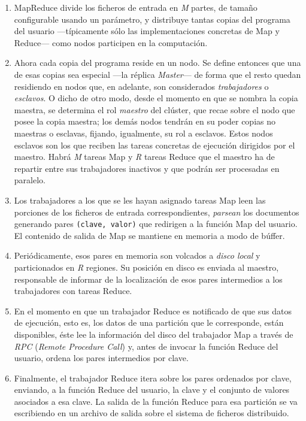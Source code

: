 \begin{enumerate}
 \item MapReduce divide los ficheros de entrada en \emph{M} partes, de tama\~no configurable usando un par\'ametro, y distribuye tantas copias del programa del usuario ---t\'ipicamente s\'olo las implementaciones concretas de Map y Reduce--- como nodos participen en la computaci\'on.
 \item Ahora cada copia del programa reside en un nodo. Se define entonces que una de esas copias sea especial ---la r\'eplica \emph{Master}--- de forma que el resto quedan residiendo en nodos que, en adelante, son considerados \emph{trabajadores} o \emph{esclavos}. O dicho de otro modo, desde el momento en que se nombra la copia maestra, se determina el rol \emph{maestro} del cl\'uster, que recae sobre el nodo que posee la copia maestra; los dem\'as nodos tendr\'an en su poder copias no maestras o esclavas, fijando, igualmente, su rol a esclavos. Estos nodos esclavos son los que reciben las tareas concretas de ejecuci\'on dirigidos por el maestro. Habr\'a \emph{M} tareas Map y \emph{R} tareas Reduce que el maestro ha de repartir entre sus trabajadores inactivos y que podr\'an ser procesadas en paralelo.
 \item Los trabajadores a los que se les hayan asignado tareas Map leen las porciones de los ficheros de entrada correspondientes, \emph{parsean} los do\-cu\-men\-tos generando pares \texttt{(clave, valor)} que redirigen a la funci\'on Map del usuario. El contenido de salida de Map se mantiene en memoria a modo de b\'uffer.
 \item Peri\'odicamente, esos pares en memoria son volcados a \emph{disco local} y particionados en \emph{R} regiones. Su posici\'on en disco es enviada al maestro, responsable de informar de la localizaci\'on de esos pares intermedios a los trabajadores con tareas Reduce.
 \item En el momento en que un trabajador Reduce es notificado de que sus datos de ejecuci\'on, esto es, los datos de una partici\'on que le co\-rres\-pon\-de, est\'an disponibles, \'este lee la informaci\'on del disco del trabajador Map a trav\'es de \emph{RPC} (\emph{Remote Procedure Call}) y, antes de invocar la funci\'on Reduce del usuario, ordena los pares intermedios por clave.
 \item Finalmente, el trabajador Reduce itera sobre los pares ordenados por clave, enviando, a la funci\'on Reduce del usuario, la clave y el conjunto de valores asociados a esa clave. La salida de la funci\'on Reduce para esa partici\'on se va escribiendo en un archivo de salida sobre el sistema de ficheros distribuido.
\end{enumerate}


